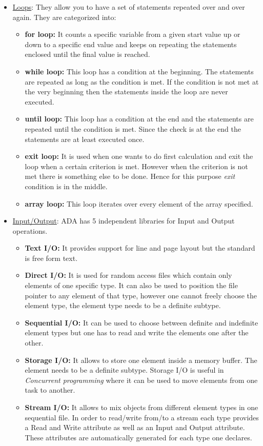 \documentclass{article}
\begin{document}
\begin{itemize}
	\item \uline{Loops}: They allow you to have a set of statements repeated over and over again. They are categorized into:
		\begin{itemize}
			\item \textbf{for loop:} It counts a specific variable from a given start value up or down to a specific end value and keeps on repeating the statements enclosed until the final value is reached.
			\item \textbf{while loop:} This loop has a condition at the beginning. The statements are repeated as long as the condition is met. If the condition is not met at the very beginning then the statements inside the loop are never executed.
			\item \textbf{until loop:} This loop has a condition at the end and the statements are repeated until the condition is met. Since the check is at the end the statements are at least executed once.
			\item \textbf{exit loop:} It is used when one wants to do first calculation and exit the loop when a certain criterion is met. However when the criterion is not met there is something else to be done. Hence for this purpose \emph{exit} condition is in the middle.
			\item \textbf{array loop:} This loop iterates over every element of the array specified.
		\end{itemize}
		
	\item \uline{Input/Output}: ADA has 5 independent libraries for Input and Output operations.
	
	\begin{itemize}
		\item \textbf{Text I/O:} It provides support for line and page layout but the standard is free form text.
		\item \textbf{Direct I/O:} It is used for random access files which contain only elements of one specific type. It can also be used to position the file pointer to any element of that type, however one cannot freely choose the element type, the element type needs to be a definite subtype.
		\item \textbf{Sequential I/O:} It can be used to choose between definite and indefinite element types but one has to read and write the elements one after the other.
		\item \textbf{Storage I/O:} It allows to store one element inside a memory buffer. The element needs to be a
definite subtype. Storage I/O is useful in \emph{Concurrent programming} where it can be used to move elements from one task to another.
		\item \textbf{Stream I/O:} It allows to mix objects from different element types in one sequential file. In order to read/write from/to a stream each type provides a Read and Write attribute as well as an Input and Output attribute. These attributes are automatically generated for each type one declares.
	\end{itemize}
	

\end{itemize}
\end{document}

